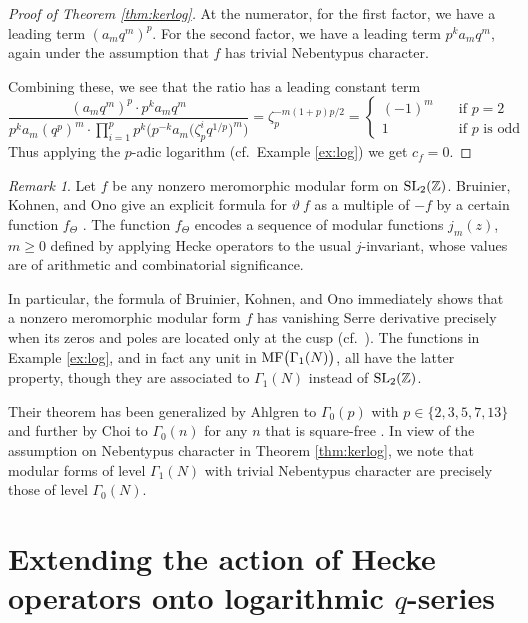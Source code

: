 \documentclass{gtpart}
\theoremstyle{definition}
\theoremstyle{remark}
\newtheorem{rmk}[equation]{Remark}
\newcommand{\mb}[1]{\mathbb{#1}}
\newcommand{\BZ}{{\mb Z}}
\newcommand{\MF}{{\rm MF}}
\newcommand{\G}{\Gamma}
\renewcommand{\=}{\approx}
\renewcommand{\-}{\sim}
\newcommand{\SL}{{\rm SL}}
\numberwithin{equation}{section}
\begin{document}
\begin{proof}[Proof of Theorem \ref{thm:kerlog}]
 At the numerator, for the first factor, we have a leading term $(a_m q^m)^p$.  
 For the second factor, we have a leading term $p^k a_m q^m$, again under the 
 assumption that $f$ has trivial Nebentypus character.  

 Combining these, we see that the ratio has a leading constant term 
 \[
  \frac{(a_m q^m)^p \cdot p^k a_m q^m}{p^k a_m (q^p)^m \cdot \prod_{i=1}^p p^k 
  \Big( p^{-k} a_m \big( \zeta_p^i q^{1/p} \big)^m \Big)} = 
  \zeta_p^{-m (1 + p) p / 2} = \left\{\!\!
  \begin{array}{cl}
    (-1)^m & \quad \text{if $p = 2$} \\
    1 & \quad \text{if $p$ is odd} 
  \end{array}
  \right.
 \]
 Thus applying the $p$-adic logarithm (cf.~Example \ref{ex:log}) we get 
 $c_f = 0$.  
\end{proof}

\begin{rmk}
 Let $f$ be any nonzero meromorphic modular form on $\SL_2(\BZ)$.  Bruinier, 
 Kohnen, and Ono give an explicit formula for $\vartheta ~\! f$ as a multiple of 
 $-f$ by a certain function $f_\Theta$ \cite[Theorem 1]{BKO}.  The function 
 $f_\Theta$ encodes a sequence of modular functions $j_m(z)$, $m \geq 0$ defined 
 by applying Hecke operators to the usual $j$-invariant, whose values are of 
 arithmetic and combinatorial significance.  

 In particular, the formula of Bruinier, Kohnen, and Ono immediately shows that 
 a nonzero meromorphic modular form $f$ has vanishing Serre derivative precisely 
 when its zeros and poles are located only at the cusp 
 (cf.~\cite[Proposition 6]{DumasRoyer}).  The functions in Example \ref{ex:log}, 
 and in fact any unit in $\MF\big(\G_1(N)\big)$, all have the latter property, 
 though they are associated to $\G_1(N)$ instead of $\SL_2(\BZ)$.  

 Their theorem has been generalized by Ahlgren to $\G_0(p)$ with 
 $p \in \{2,3,5,7,13\}$ \cite[Theorem 2]{Ahlgren} and further by Choi to 
 $\G_0(n)$ for any $n$ that is square-free \cite[Theorem 3.4]{Choi}.  In view of 
 the assumption on Nebentypus character in Theorem \ref{thm:kerlog}, we note 
 that modular forms of level $\G_1(N)$ with trivial Nebentypus character are 
 precisely those of level $\G_0(N)$.  
\end{rmk}



\section{Extending the action of Hecke operators onto logarithmic $q$-series}
\label{sec:logq}
\end{document}
